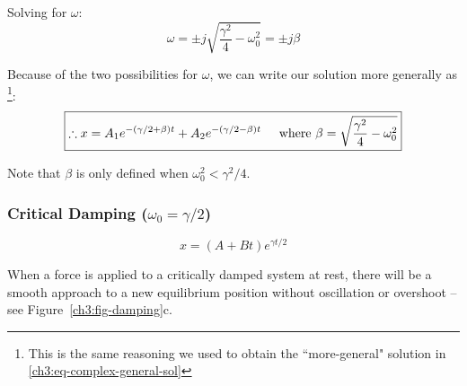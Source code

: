 Solving for $\omega$:
\[ \omega = \pm j\sqrt{ \frac{\gamma^2}{4}-\omega_0^2  } = \pm j\beta \]

Because of the two possibilities for $\omega$, we can write our solution more generally as%
\footnote{This is the same reasoning we used to obtain the ``more-general" solution in \eqref{ch3:eq-complex-general-sol}}:
\[ \boxed{ \therefore
x = A_1 e^{-(\gamma/2 + \beta)t} + A_2 e^{-(\gamma/2-\beta)t} 
\hspace{0.5cm}\text{where } \beta = \sqrt{\frac{\gamma^2}{4}-\omega_0^2} 
} \]

Note that $\beta$ is only defined when $\omega_0^2 < \gamma^2/4$.

\subsubsection{Critical Damping ($ \omega_0 = \gamma/2 $)}
\[ \boxed{x = (A + Bt) e^{\gamma t/2}} \]

When a force is applied to a critically damped system at rest, there will be a smooth approach to a new equilibrium position without oscillation or overshoot -- see Figure~\ref{ch3:fig-damping}c.